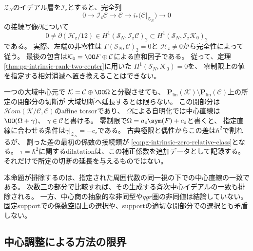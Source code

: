 \begin{remark}[相対コホモロジーと中心直線の選択]
\label{rem:pg-intrinsic-zero-relative-obstruction}
$\mathcal Z_N$のイデアル層を$\mathcal I_{\mathrm z}$とすると、完全列
\begin{equation}
 0\longrightarrow\mathcal I_{\mathrm z}\mathcal C
 \longrightarrow\mathcal C
 \longrightarrow i_*\bigl(\mathcal C|_{\mathcal Z_N}\bigr)
 \longrightarrow0
 \label{eq:pg-intrinsic-zero-relative-sequence}
\end{equation}
の接続写像$\partial$について
\begin{equation}
 0\ne
 \partial(\mathscr H_{\mathrm z}/12)
 \in H^1(\mathcal S_N,\mathcal I_{\mathrm z}\mathcal C)_2
 \subset H^1(\mathcal S_N,\mathcal I_{\mathrm z}\mathcal K_0)_2
 \label{eq:pg-intrinsic-zero-relative-class}
\end{equation}
である。
実際、左端の非零性は
$\Gamma(\mathcal S_N,\mathcal C)_2=0$と
$\mathscr H_{\mathrm z}\ne0$から完全性によって従う。
最後の包含は$\mathcal K_0=\OO F\oplus\mathcal C$による直和因子である。
従って、定理\ref{thm:pg-intrinsic-rank-two-center}に用いた
$H^1(\mathcal S_N,\mathcal K_0)=0$を、
零制限上の値を指定する相対消滅へ置き換えることはできない。

一つの大域中心元で
$\mathcal K=\mathcal C\oplus\OO\Omega$と分裂させても、
$\mathbf P_{\mathrm{lin}}(\mathcal K)\setminus
\mathbf P_{\mathrm{lin}}(\mathcal C)$上の所定の閉部分の切断が
大域切断へ延長するとは限らない。
この開部分は$\mathcal Hom(\mathcal K/\mathcal C,\mathcal C)$のaffine torsorであり、
$\Omega$による自明化では中心直線は$\OO(\Omega+\gamma)$、
$\gamma\in\mathcal C$と書ける。
零制限で$\Omega=a_{\mathrm z}\sym(F)+c_{\mathrm z}$と書くと、
指定直線に合わせる条件は$\gamma|_{\mathcal Z_N}=-c_{\mathrm z}$である。
古典極限と偶性からこの差は$\hbar^2$で割れるが、
割った差の最初の係数の接続類が
\eqref{eq:pg-intrinsic-zero-relative-class}となる。
$\tau=\hbar^2$に関するdilatationは、この補正係数を追加データとして記録する。
それだけで所定の切断の延長を与えるものではない。

本命題が排除するのは、指定された周囲代数の同一視の下での中心直線の一致である。
次数三の部分で比較すれば、その生成する斉次中心イデアルの一致も排除される。
一方、中心商の抽象的な非同型や$qgr$圏の非同値は結論していない。
固定supportでの係数空間上の選択や、supportの適切な開部分での選択とも矛盾しない。
\end{remark}

\subsection{中心調整による方法の限界}


